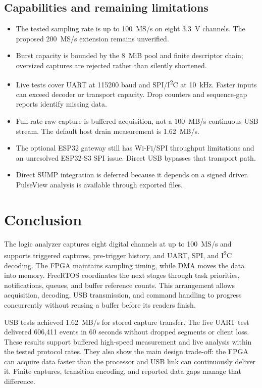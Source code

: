 \documentclass[11pt,a4paper]{article}
\newcommand{\code}[1]{\texttt{\detokenize{#1}}}
\newcommand{\iu}{I\textsuperscript{2}C}
\begin{document}
\subsection{Capabilities and remaining limitations}

\begin{itemize}[leftmargin=1.4em,itemsep=2pt,topsep=2pt]
\item The tested sampling rate is up to 100~MS/s on eight 3.3~V channels.
The proposed 200~MS/s extension remains unverified.
\item Burst capacity is bounded by the 8~MiB pool and finite descriptor chain;
oversized captures are rejected rather than silently shortened.
\item Live tests cover UART at 115200 baud and SPI/\iu{} at 10~kHz. Faster
inputs can exceed decoder or transport capacity. Drop counters and sequence-gap
reports identify missing data.
\item Full-rate raw capture is buffered acquisition, not a 100~MB/s continuous
USB stream. The default host drain measurement is 1.62~MB/s.
\item The optional ESP32 gateway still has Wi-Fi/SPI throughput limitations
and an unresolved ESP32-S3 SPI issue. Direct USB bypasses that transport path.
\item Direct SUMP integration is deferred because it depends on a signed
driver. PulseView analysis is available through exported \code{.sr} files.
\end{itemize}

\section{Conclusion}

The logic analyzer captures eight digital channels at up to 100~MS/s and supports
triggered captures, pre-trigger history, and UART, SPI, and \iu{} decoding.
The FPGA maintains sampling timing, while DMA moves the data into memory.
FreeRTOS coordinates the next stages through task priorities, notifications,
queues, and buffer reference counts. This arrangement allows acquisition,
decoding, USB transmission, and command handling to progress concurrently
without reusing a buffer before its readers finish.

USB tests achieved 1.62~MB/s for stored capture transfer. The live UART test
delivered 606,411 events in 60 seconds without dropped segments or client loss.
These results support buffered high-speed measurement and live analysis within
the tested protocol rates. They also show the main design trade-off: the FPGA
can acquire data faster than the processor and USB link can continuously deliver
it. Finite captures, transition encoding, and reported data gaps manage that
difference.
\end{document}
